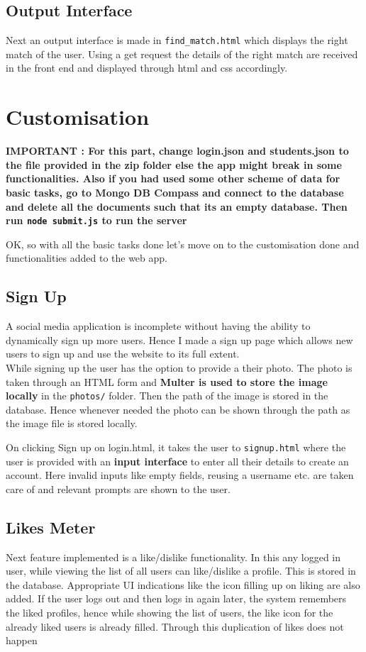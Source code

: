\documentclass{article}
\begin{document}
\subsection{Output Interface}
Next an output interface is made in \texttt{find\_match.html} which displays the right match of the user. Using a get request the details of the right match are received in the front end and displayed through html and css accordingly.

\section{Customisation}

\textbf{IMPORTANT : For this part, change login.json and students.json to the file provided in the zip folder else the app might break in some functionalities. Also if you had used some other scheme of data for basic tasks, go to Mongo DB Compass and connect to the database and delete all the documents such that its an empty database. Then run \texttt{node submit.js} to run the server}


OK, so with all the basic tasks done let's move on to the customisation done and functionalities added to the web app.
\subsection{Sign Up}
A social media application is incomplete without having the ability to dynamically sign up more users. Hence I made a sign up page which allows new users to sign up and use the website to its full extent.  \\

While signing up the user has the option to provide a their photo. The photo is taken through an HTML form and \textbf{Multer is used to store the image locally} in the \texttt{photos/} folder. Then the path of the image is stored in the database. Hence whenever needed the photo can be shown through the path as the image file is stored locally. 

On clicking Sign up on login.html, it takes the user to \texttt{signup.html} where the user is provided with an \textbf{input interface} to enter all their details to create an account. Here invalid inputs like empty fields, reusing a username etc. are taken care of and relevant prompts are shown to the user.
\subsection{Likes Meter}
Next feature implemented is a like/dislike functionality. In this any logged in user, while viewing the list of all users can like/dislike a profile. This is stored in the database. Appropriate UI indications like the icon filling up on liking are also added. If the user logs out and then logs in again later, the system remembers the liked profiles, hence while showing the list of users, the like icon for the already liked users is already filled. Through this duplication of likes does not happen
\end{document}
